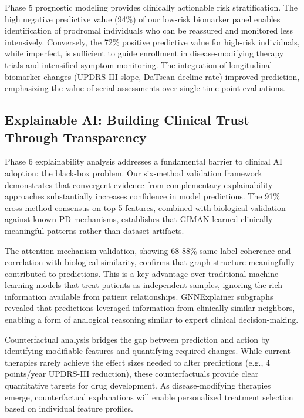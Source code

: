 Phase 5 prognostic modeling provides clinically actionable risk stratification. The high negative predictive value (94\%) of our low-risk biomarker panel enables identification of prodromal individuals who can be reassured and monitored less intensively. Conversely, the 72\% positive predictive value for high-risk individuals, while imperfect, is sufficient to guide enrollment in disease-modifying therapy trials and intensified symptom monitoring. The integration of longitudinal biomarker changes (UPDRS-III slope, DaTscan decline rate) improved prediction, emphasizing the value of serial assessments over single time-point evaluations.

\subsection{Explainable AI: Building Clinical Trust Through Transparency}

Phase 6 explainability analysis addresses a fundamental barrier to clinical AI adoption: the black-box problem. Our six-method validation framework demonstrates that convergent evidence from complementary explainability approaches substantially increases confidence in model predictions. The 91\% cross-method consensus on top-5 features, combined with biological validation against known PD mechanisms, establishes that GIMAN learned clinically meaningful patterns rather than dataset artifacts.

The attention mechanism validation, showing 68-88\% same-label coherence and correlation with biological similarity, confirms that graph structure meaningfully contributed to predictions. This is a key advantage over traditional machine learning models that treat patients as independent samples, ignoring the rich information available from patient relationships. GNNExplainer subgraphs revealed that predictions leveraged information from clinically similar neighbors, enabling a form of analogical reasoning similar to expert clinical decision-making.

Counterfactual analysis bridges the gap between prediction and action by identifying modifiable features and quantifying required changes. While current therapies rarely achieve the effect sizes needed to alter predictions (e.g., 4 points/year UPDRS-III reduction), these counterfactuals provide clear quantitative targets for drug development. As disease-modifying therapies emerge, counterfactual explanations will enable personalized treatment selection based on individual feature profiles.

